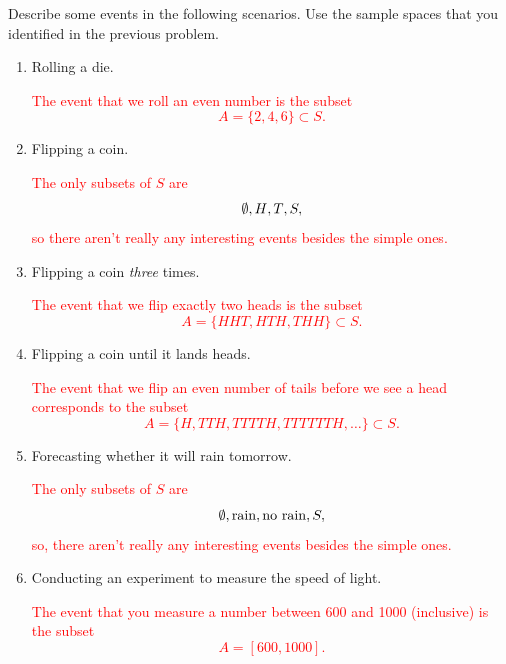 \documentclass[12pt,reqno]{amsart}
\begin{document}
\bigskip
\prob Describe some events in the following scenarios. Use the sample spaces that you identified in the previous problem.

\medskip
\begin{enumerate}
    \item Rolling a die.
    
    \medskip
    \textcolor{red}{The event that we roll an even number is the subset
        \[
    A = \{2, 4, 6\} \subset S.
    \]}
    \bigskip

    \item Flipping a coin.
    
    \medskip
    \textcolor{red}{The only subsets of $S$ are
    \[
    \emptyset, \\{H\\}, \\{T\\}, S,
    \] so there aren't really any interesting events besides the simple ones.}
    \bigskip

    \item Flipping a coin \textit{three} times.
    
    \medskip
    \textcolor{red}{The event that we flip exactly two heads is the subset
    \[
    A = \{HHT, HTH, THH\}\subset S.
    \]}
    \bigskip

    \item Flipping a coin until it lands heads.
    
    \medskip
    \textcolor{red}{The event that we flip an even number of tails before we see a head corresponds to the subset
    \[
    A = \{ H, TTH, TTTTH, TTTTTTH, \ldots\} \subset S.
    \]}
    \bigskip

    \item Forecasting whether it will rain tomorrow.
    
    \medskip
    \textcolor{red}{The only subsets of $S$ are
    \[
    \emptyset, \\{\text{rain}\\}, \\{\text{no rain}\\}, S,
    \] so, there aren't really any interesting events besides the simple ones.}
    \bigskip

    \item Conducting an experiment to measure the speed of light.
    
    \medskip
    \textcolor{red}{The event that you measure a number between 600 and 1000 (inclusive) is the subset
    \[
    A = [600, 1000].
    \]}
\end{enumerate}
\end{document}
